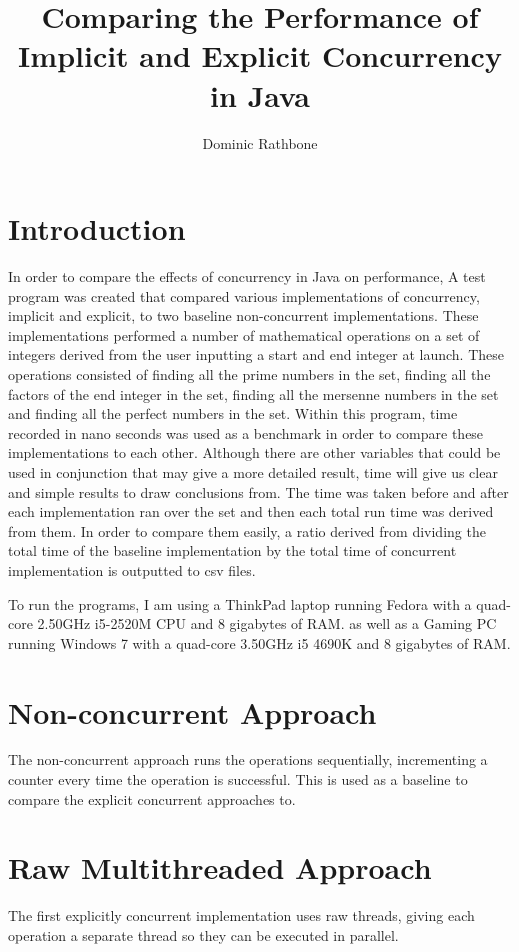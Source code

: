 \documentclass[]{report}
\title{Comparing the Performance of Implicit and Explicit Concurrency in Java}
\author{Dominic Rathbone}
\begin{document}
\maketitle

\section*{Introduction}
In order to compare the effects of concurrency in Java on performance, A test program was created that compared various implementations of concurrency, implicit and explicit, to two baseline non-concurrent implementations. These implementations performed a number of mathematical operations on a set of integers derived from the user inputting a start and end integer at launch. These operations consisted of finding all the prime numbers in the set, finding all the factors of the end integer in the set, finding all the mersenne numbers in the set and finding all the perfect numbers in the set. Within this program, time recorded in nano seconds was used as a benchmark in order to compare these implementations to each other. Although there are other variables that could be used in conjunction that may give a more detailed result, time will give us clear and simple results to draw conclusions from. The time was taken before and after each implementation ran over the set and then each total run time was derived from them. In order to compare them easily, a ratio derived from dividing the total time of the baseline implementation by the total time of concurrent implementation is outputted to csv files.

To run the programs, I am using a ThinkPad laptop running Fedora with a quad-core 2.50GHz i5-2520M CPU and 8 gigabytes of RAM. as well as a Gaming PC running Windows 7 with a quad-core 3.50GHz i5 4690K and 8 gigabytes of RAM.
\section{Non-concurrent Approach}
The non-concurrent approach runs the operations sequentially, incrementing a counter every time the operation is successful. This is used as a baseline to compare the explicit concurrent approaches to.

\section{Raw Multithreaded Approach}
The first explicitly concurrent implementation uses raw threads,  giving each operation a separate thread so they can be executed in parallel.
\end{document}
